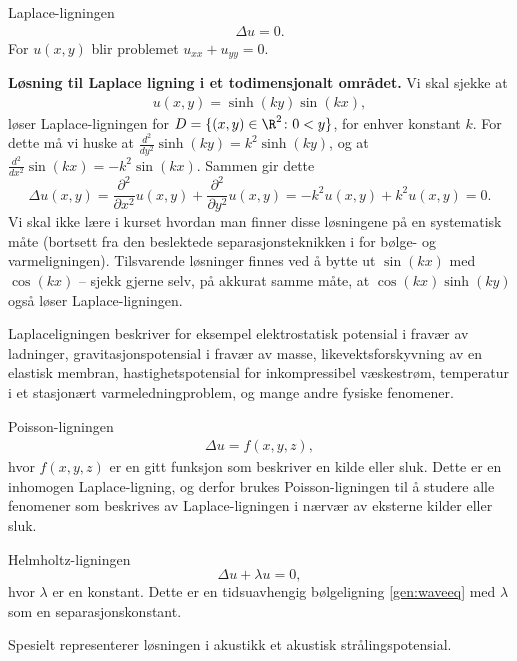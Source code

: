 \begin{eks}{Laplace-ligningen}
\begin{align}\label{eq:Laplace}
\Delta u = 0. 
\end{align}
For $u(x,y)$ blir problemet $u_{xx}+u_{yy}=0$.

\textbf{Løsning til Laplace ligning i et todimensjonalt området.} Vi skal sjekke at 
\begin{align}\label{Laplace:loes}
u(x,y)=\sinh (ky)\sin(kx),\end{align}
løser Laplace-ligningen for $D=\{(x,y) \in \R^2 \colon 0< y\}$, for enhver konstant $k$.
For dette må vi huske at $\frac{d^2}{dy^2} \sinh (ky)=k^2\sinh(ky)$, og at $\frac{d^2}{dx^2}\sin(kx)=-k^2\sin(kx)$. Sammen gir dette
\[\Delta u(x,y) = \frac{\partial^2}{\partial x^2}u(x,y)+\frac{\partial^2}{\partial y^2}u(x,y) = -k^2u(x,y)+k^2u(x,y)=0.\]
Vi skal ikke lære i kurset hvordan man finner disse løsningene på en systematisk måte (bortsett fra den beslektede separasjonsteknikken i  for bølge- og varmeligningen). Tilsvarende løsninger finnes ved å bytte ut $\sin(kx)$ med $\cos(kx)$ -- sjekk gjerne selv, på akkurat samme måte, at $\cos(kx)\sinh(ky)$ også løser Laplace-ligningen.
\end{eks}
Laplaceligningen beskriver for eksempel elektrostatisk potensial i fravær av ladninger, gravitasjonspotensial i fravær av masse, likevektsforskyvning av en elastisk membran, hastighetspotensial for inkompressibel væskestrøm, temperatur i et stasjonært varmeledningproblem, og mange andre fysiske fenomener.

\begin{eks}{Poisson-ligningen}
\begin{align}\label{eq:Poisson}
\Delta u = f(x, y, z),
\end{align}
hvor \( f(x, y, z) \) er en gitt funksjon som beskriver en kilde eller sluk. Dette er en inhomogen Laplace-ligning, og derfor brukes Poisson-ligningen til å studere alle fenomener som beskrives av Laplace-ligningen i nærvær av eksterne kilder eller sluk.
\end{eks}

\begin{eks}{Helmholtz-ligningen}
\[
\Delta u + \lambda u = 0, 
\]
hvor \( \lambda \) er en konstant. Dette er en tidsuavhengig bølgeligning \eqref{gen:waveeq} med \( \lambda \) som en separasjonskonstant. 
\end{eks}
Spesielt representerer løsningen i akustikk et akustisk strålingspotensial.

